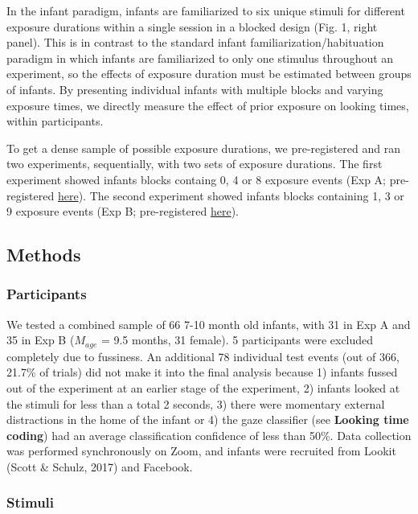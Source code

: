 \documentclass[10pt, letterpaper]{article}
\begin{document}
In the infant paradigm, infants are familiarized to six unique stimuli
for different exposure durations within a single session in a blocked
design (Fig. 1, right panel). This is in contrast to the standard infant
familiarization/habituation paradigm in which infants are familiarized
to only one stimulus throughout an experiment, so the effects of
exposure duration must be estimated between groups of infants. By
presenting individual infants with multiple blocks and varying exposure
times, we directly measure the effect of prior exposure on looking
times, within participants.

To get a dense sample of possible exposure durations, we pre-registered
and ran two experiments, sequentially, with two sets of exposure
durations. The first experiment showed infants blocks containg 0, 4 or 8
exposure events (Exp A; pre-registered
\href{https://osf.io/gux4f/?view_only=b4d6d0118dfa41a79fb431d389f4fecc}{here}).
The second experiment showed infants blocks containing 1, 3 or 9
exposure events (Exp B; pre-registered
\href{https://osf.io/w6pgu/?view_only=39ee108159884761a0c5bc68d11918df}{here}).

\hypertarget{methods-1}{%
\subsection{Methods}\label{methods-1}}

\hypertarget{participants-1}{%
\subsubsection{Participants}\label{participants-1}}

We tested a combined sample of 66 7-10 month old infants, with 31 in Exp
A and 35 in Exp B (\(M_{age}\) = 9.5 months, 31 female). 5 participants
were excluded completely due to fussiness. An additional 78 individual
test events (out of 366, 21.7\% of trials) did not make it into the
final analysis because 1) infants fussed out of the experiment at an
earlier stage of the experiment, 2) infants looked at the stimuli for
less than a total 2 seconds, 3) there were momentary external
distractions in the home of the infant or 4) the gaze classifier (see
\textbf{Looking time coding}) had an average classification confidence
of less than 50\%. Data collection was performed synchronously on Zoom,
and infants were recruited from Lookit (Scott \& Schulz, 2017) and
Facebook.

\hypertarget{stimuli-1}{%
\subsubsection{Stimuli}\label{stimuli-1}}
\end{document}
